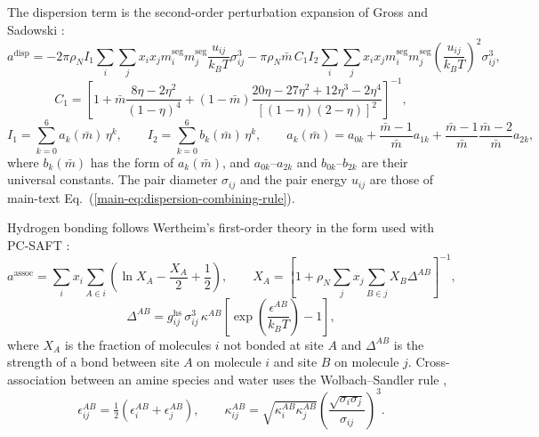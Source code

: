 \documentclass[a4paper,11pt]{article}
\begin{document}
The dispersion term is the second-order perturbation expansion of Gross and Sadowski \cite{Gross2001}:
\begin{equation}
    a^{\mathrm{disp}}
    =-2\pi\rho_N I_1\sum_i\sum_j x_ix_jm_i^{\mathrm{seg}}m_j^{\mathrm{seg}}\frac{u_{ij}}{k_BT}\sigma_{ij}^3
    -\pi\rho_N\bar m\,C_1I_2\sum_i\sum_j x_ix_jm_i^{\mathrm{seg}}m_j^{\mathrm{seg}}\left(\frac{u_{ij}}{k_BT}\right)^2\sigma_{ij}^3 ,
    \label{eq:dispersion}
\end{equation}
\begin{equation}
    C_1=\left[1+\bar m\frac{8\eta-2\eta^2}{\left(1-\eta\right)^4}
    +\left(1-\bar m\right)\frac{20\eta-27\eta^2+12\eta^3-2\eta^4}{\left[\left(1-\eta\right)\left(2-\eta\right)\right]^2}\right]^{-1},
    \label{eq:dispersion-compressibility}
\end{equation}
\begin{equation}
    I_1=\sum_{k=0}^{6}a_k(\bar m)\,\eta^k,\qquad
    I_2=\sum_{k=0}^{6}b_k(\bar m)\,\eta^k,\qquad
    a_k(\bar m)=a_{0k}+\frac{\bar m-1}{\bar m}a_{1k}+\frac{\bar m-1}{\bar m}\frac{\bar m-2}{\bar m}a_{2k},
    \label{eq:dispersion-integrals}
\end{equation}
where $b_k(\bar m)$ has the form of $a_k(\bar m)$, and $a_{0k}$--$a_{2k}$ and $b_{0k}$--$b_{2k}$ are their universal constants.
The pair diameter $\sigma_{ij}$ and the pair energy $u_{ij}$ are those of main-text Eq.~(\ref{main-eq:dispersion-combining-rule}).

Hydrogen bonding follows Wertheim's first-order theory in the form used with PC-SAFT \cite{Kleiner2007}:
\begin{equation}
    a^{\mathrm{assoc}}=\sum_i x_i\sum_{A\in i}\left(\ln X_A-\frac{X_A}{2}+\frac12\right),
    \qquad
    X_A=\left[1+\rho_N\sum_j x_j\sum_{B\in j}X_B\Delta^{AB}\right]^{-1},
    \label{eq:association}
\end{equation}
\begin{equation}
    \Delta^{AB}=g_{ij}^{\mathrm{hs}}\,\sigma_{ij}^3\,\kappa^{AB}\left[\exp\!\left(\frac{\epsilon^{AB}}{k_BT}\right)-1\right],
    \label{eq:association-strength}
\end{equation}
where $X_A$ is the fraction of molecules $i$ not bonded at site $A$ and $\Delta^{AB}$ is the strength of a bond between site $A$ on molecule $i$ and site $B$ on molecule $j$.
Cross-association between an amine species and water uses the Wolbach--Sandler rule \cite{Kleiner2007},
\begin{equation}
    \epsilon^{AB}_{ij}=\tfrac12\left(\epsilon^{AB}_i+\epsilon^{AB}_j\right),
    \qquad
    \kappa^{AB}_{ij}=\sqrt{\kappa^{AB}_i\kappa^{AB}_j}\left(\frac{\sqrt{\sigma_i\sigma_j}}{\sigma_{ij}}\right)^3 .
    \label{eq:wolbach-sandler}
\end{equation}
\end{document}
